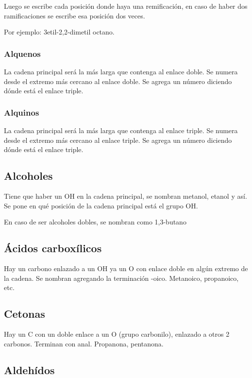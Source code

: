 Luego se escribe cada posición donde haya una remificación, en caso de haber dos ramificaciones se escribe esa posición dos veces.

Por ejemplo: 3etil-2,2-dimetil octano.


\subsubsection*{Alquenos}

La cadena principal será la más larga que contenga al enlace doble. Se numera desde el extremo más cercano al enlace doble. Se agrega un número diciendo dónde está el enlace triple.


\subsubsection*{Alquinos}

La cadena principal será la más larga que contenga al enlace triple. Se numera desde el extremo más cercano al enlace triple. Se agrega un número diciendo dónde está el enlace triple.


\subsection*{Alcoholes}

Tiene que haber un OH en la cadena principal, se nombran metanol, etanol y así. Se pone en qué posición de la cadena principal está el grupo OH.

En caso de ser alcoholes dobles, se nombran como 1,3-butano


\subsection*{Ácidos carboxílicos}

Hay un carbono enlazado a un OH  ya un O con enlace doble en algún extremo de la cadena. Se nombran agregando la terminación -oico. Metanoico, propanoico, etc.


\subsection*{Cetonas}

Hay un C con un doble enlace a un O (grupo carbonilo), enlazado a otros 2 carbonos. Terminan con anal. Propanona, pentanona.


\subsection*{Aldehídos}

